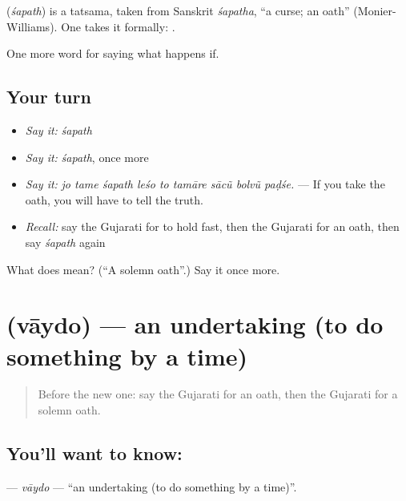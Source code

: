 \begin{cousinweb}
\textbf{} (\emph{śapath}) is a tatsama, taken from Sanskrit \emph{śapatha}, \textquotedblleft{}a curse; an oath\textquotedblright{} (Monier-Williams). One takes it formally: \textbf{ }.
\end{cousinweb}

\begin{grammarlens}[title={What you've built}]
One more word for saying what happens if.
\end{grammarlens}

\subsection*{Your turn}
\begin{itemize}
\raggedright
  \item \emph{Say it:} \emph{śapath}
  \item \emph{Say it:} \emph{śapath}, once more
  \item \emph{Say it:} \emph{jo tame śapath leśo to tamāre sācũ bolvũ paḍśe.} — If you take the oath, you will have to tell the truth.
  \item \emph{Recall:} say the Gujarati for to hold fast, then the Gujarati for an oath, then say \emph{śapath} again
\end{itemize}

\begin{tcolorbox}[breakable,colback=teal!4,colframe=teal!35!black,title={Before you move on}]
What does  mean? (\textquotedblleft{}A solemn oath\textquotedblright{}.) Say it once more.
\end{tcolorbox}
\section[\texorpdfstring{\gu{વાયદો} (vāydo)}{વાયદો (vāydo)}]{ (vāydo) — an undertaking (to do something by a time)}

\label{lesson:GU-C541-vaydo}



\begin{quote}
Before the new one: say the Gujarati for an oath, then the Gujarati for a solemn oath.
\end{quote}

\subsection*{You'll want to know: }
\textbf{} — \emph{vāydo} — \textquotedblleft{}an undertaking (to do something by a time)\textquotedblright{}.

